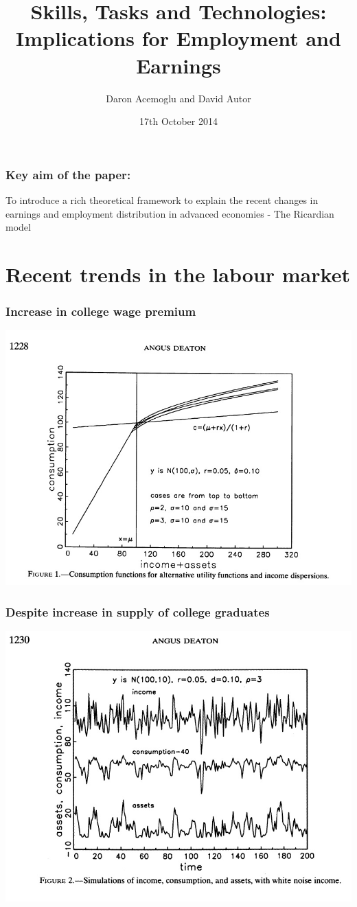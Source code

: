 \documentclass[mathserif]{beamer}
\title{Skills, Tasks and Technologies: Implications for Employment and Earnings}
\author{Daron Acemoglu and David Autor}
\institute{Handbook of Labour Economics, Volume 4b, 2011}
\date{17th October 2014}
\begin{document}
\frame{\titlepage}
\begin{frame}
\frametitle{Key aim of the paper:}
\begin{center}
To introduce a rich theoretical framework to explain the recent changes in earnings and employment distribution in advanced economies - The Ricardian model
\end{center}
\end{frame}
\section{Recent trends in the labour market}
\begin{frame}
\frametitle{Increase in college wage premium}
\includegraphics[scale=0.5]{figure1}
\end{frame}
\begin{frame}
\frametitle{Despite increase in supply of college graduates}
\includegraphics[scale=0.5]{figure2}
\end{frame}
\end{document}
